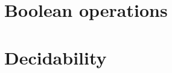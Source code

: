 \documentclass[orivec]{llncs}
\begin{document}
\section{Boolean operations}\label{sec:boolean-operations}


\section{Decidability}\label{sec:decidability}



\end{document}
